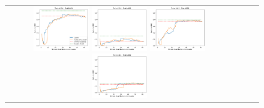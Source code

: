 \begin{figure}[h!]
\begin{tabular}{cccc}
  \includegraphics[width=0.25\textwidth]{Kap5/rbf_ALL_METHODS_train=b234test=b261}  \includegraphics[width=0.25\textwidth]{Kap5/rbf_ALL_METHODS_train=b234test=b360}
  \includegraphics[width=0.25\textwidth]{Kap5/rbf_ALL_METHODS_train=b261test=b278}  \includegraphics[width=0.25\textwidth]{Kap5/rbf_ALL_METHODS_train=b261test=b360} \\


\end{tabular}
\end{figure}
